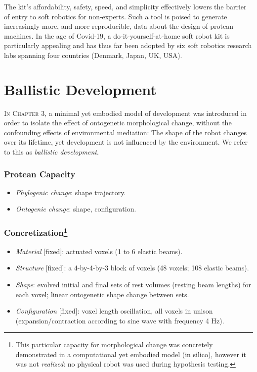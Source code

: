 The kit's affordability, safety, speed, and simplicity effectively lowers the barrier of entry to soft robotics for non-experts.
Such a tool is poised to generate increasingly more, and more reproducible, data about the design of protean machines.
In the age of Covid-19, a do-it-yourself-at-home soft robot kit 
is particularly appealing and has thus far been adopted by six soft robotics research labs spanning four countries (Denmark, Japan, UK, USA).


\section{Ballistic Development}


\textsc{In Chapter 3,}
a minimal yet embodied model of development was introduced in order to isolate the effect of ontogenetic morphological change,
without the confounding effects of environmental mediation:
The shape of the
robot changes over its lifetime, yet development is not influenced
by the environment.
We refer to this as \textit{ballistic development}.


\subsubsection*{Protean Capacity}

\begin{itemize}
    \item \textit{Phylogenic change}: shape trajectory.
    \item \textit{Ontogenic change}: shape, configuration.
\end{itemize}

\subsubsection*{Concretization\footnote{This particular capacity for morphological change was concretely demonstrated in a computational yet embodied model (in silico), however it was not \textit{realized}: no physical robot was used during hypothesis testing.}}

\begin{itemize}
    \item \textit{Material} [fixed]: actuated voxels (1 to 6 elastic beams).
    \item \textit{Structure} [fixed]: a 4-by-4-by-3 block of voxels (48 voxels; 108 elastic beams).
    \item \textit{Shape}: evolved initial and final sets of rest volumes (resting beam lengths) for each voxel; linear ontogenetic shape change between sets.
    \item \textit{Configuration} [fixed]: voxel length oscillation, all voxels in unison (expansion/contraction according to sine wave with frequency 4 Hz).
\end{itemize}


